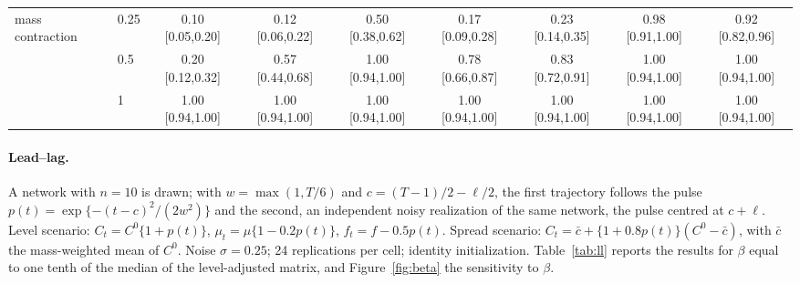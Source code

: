 \documentclass[12pt]{article}
\begin{document}
\begin{table}[h]
\begin{tabular}{llccccccc}
mass contraction & 0.25 & 0.10 {\tiny[0.05,0.20]} & 0.12 {\tiny[0.06,0.22]} & 0.50 {\tiny[0.38,0.62]} & 0.17 {\tiny[0.09,0.28]} & 0.23 {\tiny[0.14,0.35]} & 0.98 {\tiny[0.91,1.00]} & 0.92 {\tiny[0.82,0.96]}\\
 & 0.5 & 0.20 {\tiny[0.12,0.32]} & 0.57 {\tiny[0.44,0.68]} & 1.00 {\tiny[0.94,1.00]} & 0.78 {\tiny[0.66,0.87]} & 0.83 {\tiny[0.72,0.91]} & 1.00 {\tiny[0.94,1.00]} & 1.00 {\tiny[0.94,1.00]}\\
 & 1 & 1.00 {\tiny[0.94,1.00]} & 1.00 {\tiny[0.94,1.00]} & 1.00 {\tiny[0.94,1.00]} & 1.00 {\tiny[0.94,1.00]} & 1.00 {\tiny[0.94,1.00]} & 1.00 {\tiny[0.94,1.00]} & 1.00 {\tiny[0.94,1.00]}\\
\bottomrule
\end{tabular}

\end{table}

\paragraph{Lead--lag.} A network with $n=10$ is drawn; with $w=\max(1,T/6)$ and $c=(T-1)/2-\ell/2$, the first trajectory follows the pulse $p(t)=\exp\{-(t-c)^2/(2w^2)\}$ and the second, an independent noisy realization of the same network, the pulse centred at $c+\ell$. Level scenario: $C_t=C^0\{1+p(t)\}$, $\mu_t=\mu\{1-0.2p(t)\}$, $f_t=f-0.5p(t)$. Spread scenario: $C_t=\bar c+\{1+0.8p(t)\}(C^0-\bar c)$, with $\bar c$ the mass-weighted mean of $C^0$. Noise $\sigma=0.25$; 24 replications per cell; identity initialization. Table~\ref{tab:ll} reports the results for $\beta$ equal to one tenth of the median of the level-adjusted matrix, and Figure~\ref{fig:beta} the sensitivity to $\beta$.
\end{document}
